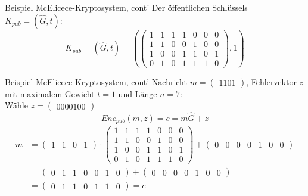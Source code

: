 \documentclass[11pt%
,aspectratio=169%
]{beamer}
\begin{document}
\begin{frame}{Beispiel McElicece-Kryptosystem, cont'}
Der öffentlichen Schlüssels $K_{pub} = (\hat{G},t)$:
$$
    K_{pub} = (\hat{G},t) =\left(\begin{pmatrix} 1 & 1 & 1 & 1 & 0 & 0 & 0 \\ 1 & 1 & 0 & 0 & 1 & 0 & 0 \\ 1 & 0 & 0 & 1 & 1 & 0 & 1 \\ 0 & 1 & 0 & 1 & 1 & 1 & 0 \end{pmatrix},1\right)
$$
\end{frame}

\begin{frame}{Beispiel McElicece-Kryptosystem, cont'}
Nachricht $m = \begin{pmatrix} 1 1 0 1 \end{pmatrix}$, Fehlervektor $z$ mit maximalem Gewicht $t = 1$ und Länge $n = 7$: \\
Wähle $z =  \begin{pmatrix} 0 0 0 0 1 0 0 \end{pmatrix}$ 
$$
    Enc_{pub}(m,z) = c = m\hat{G} + z
$$
\begin{align*}
    m &= \begin{pmatrix} 1 & 1 & 0 & 1 \end{pmatrix} \cdot \begin{pmatrix} 1 & 1 & 1 & 1 & 0 & 0 & 0 \\ 1 & 1 & 0 & 0 & 1 & 0 & 0 \\ 1 & 0 & 0 & 1 & 1 & 0 & 1 \\ 0 & 1 & 0 & 1 & 1 & 1 & 0 \end{pmatrix} + \begin{pmatrix} 0 & 0 & 0 & 0 & 1 & 0 & 0 \end{pmatrix}\\
    &= \begin{pmatrix} 0 & 1 & 1 & 0 & 0 & 1 & 0 \end{pmatrix} + \begin{pmatrix} 0 & 0 & 0 & 0 & 1 & 0 & 0 \end{pmatrix}\\
    &= \begin{pmatrix} 0 & 1 & 1 & 0 & 1 & 1 & 0 \end{pmatrix}=c    
\end{align*}
\end{frame}
\end{document}
